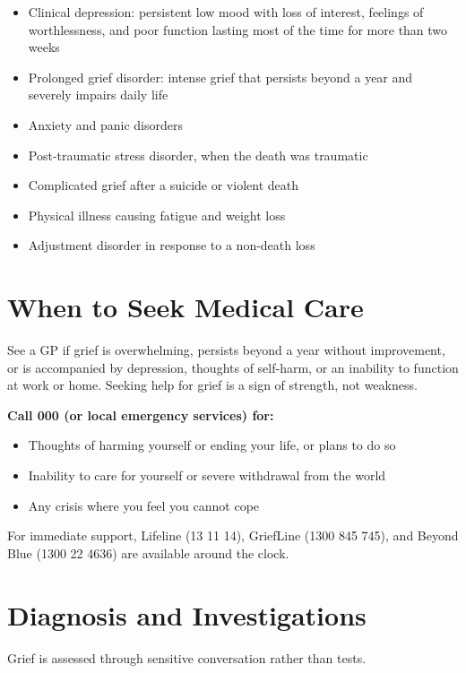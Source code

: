 \begin{itemize}
    \item Clinical depression: persistent low mood with loss of interest, feelings of worthlessness, and poor function lasting most of the time for more than two weeks
    \item Prolonged grief disorder: intense grief that persists beyond a year and severely impairs daily life
    \item Anxiety and panic disorders
    \item Post-traumatic stress disorder, when the death was traumatic
    \item Complicated grief after a suicide or violent death
    \item Physical illness causing fatigue and weight loss
    \item Adjustment disorder in response to a non-death loss
\end{itemize}

\section*{When to Seek Medical Care}
See a GP if grief is overwhelming, persists beyond a year without improvement, or is accompanied by depression, thoughts of self-harm, or an inability to function at work or home. Seeking help for grief is a sign of strength, not weakness.

\textbf{Call 000 (or local emergency services) for:}
\begin{itemize}
    \item Thoughts of harming yourself or ending your life, or plans to do so
    \item Inability to care for yourself or severe withdrawal from the world
    \item Any crisis where you feel you cannot cope
\end{itemize}
For immediate support, Lifeline (13 11 14), GriefLine (1300 845 745), and Beyond Blue (1300 22 4636) are available around the clock.

\section*{Diagnosis and Investigations}
Grief is assessed through sensitive conversation rather than tests.

